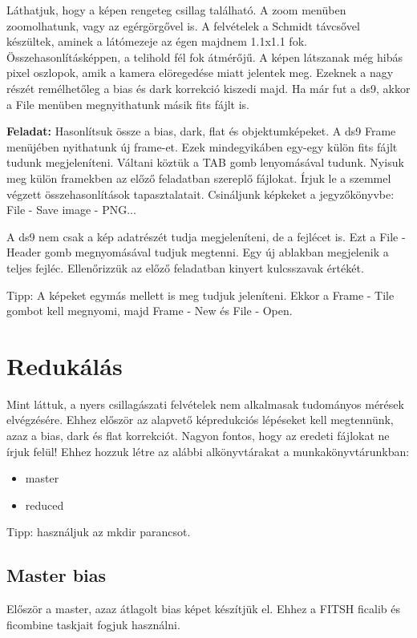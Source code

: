 \documentclass{article}
\begin{document}
Láthatjuk, hogy a képen rengeteg csillag található. A zoom menüben zoomolhatunk,
vagy az egérgörgővel is. A felvételek a Schmidt távcsővel készültek, aminek a
látómezeje az égen majdnem 1.1x1.1 fok. Összehasonlításképpen, a telihold fél
fok átmérőjű.
A képen látszanak még hibás pixel oszlopok, amik a kamera elöregedése miatt
jelentek meg. Ezeknek a nagy részét remélhetőleg a bias és dark korrekció
kiszedi majd.
Ha már fut a ds9, akkor a File menüben megnyithatunk másik fits fájlt is.

{\bf Feladat:}
Hasonlítsuk össze a bias, dark, flat és objektumképeket.
A ds9 Frame menüjében nyithatunk új frame-et. Ezek mindegyikáben egy-egy külön
fits fájlt tudunk megjeleníteni. Váltani köztük a TAB gomb lenyomásával tudunk.
Nyisuk meg külön framekben az előző feladatban szereplő fájlokat. Írjuk le a
szemmel végzett összehasonlítások tapasztalatait. Csináljunk képkeket a
jegyzőkönyvbe:
File - Save image - PNG...

A ds9 nem csak a kép adatrészét tudja megjeleníteni, de a fejlécet is. Ezt a
File - Header gomb megnyomásával tudjuk megtenni. Egy új ablakban megjelenik a
teljes fejléc. Ellenőrizzük az előző feladatban kinyert kulcsszavak értékét.

Tipp: A képeket egymás mellett is meg tudjuk jeleníteni. Ekkor a Frame - Tile
gombot kell megnyomi, majd Frame - New és File - Open.

\section{Redukálás}

Mint láttuk, a nyers csillagászati felvételek nem alkalmasak tudományos mérések
elvégzésére. Ehhez először az alapvető képredukciós lépéseket kell megtennünk,
azaz a bias, dark és flat korrekciót.
Nagyon fontos, hogy az eredeti fájlokat ne írjuk felül!
Ehhez hozzuk létre az alábbi alkönyvtárakat a munkakönyvtárunkban:
\begin{itemize}
  \item master
  \item reduced
\end{itemize}
Tipp: használjuk az mkdir parancsot.

\subsection{Master bias}
Először a master, azaz átlagolt bias képet készítjük el. Ehhez a FITSH ficalib
és ficombine taskjait fogjuk használni.
\end{document}
